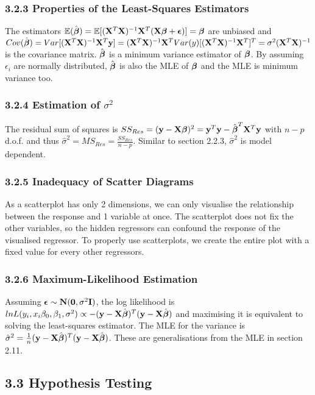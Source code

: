 \begin{multicols*}{3}
\subsubsection{3.2.3 Properties of the Least-Squares Estimators}
The estimators $\mathbb{E}(\hat{\boldsymbol{\beta}}) = \mathbb{E}[(\mathbf{X}^T\mathbf{X})^{-1}\mathbf{X}^T(\mathbf{X}\boldsymbol{\beta} + \boldsymbol{\epsilon})] = \boldsymbol{\beta}$ are unbiased and $Cov(\hat{\boldsymbol{\beta}}) = Var[(\mathbf{X}^T\mathbf{X})^{-1}\mathbf{X}^T\mathbf{y}] = (\mathbf{X}^T\mathbf{X})^{-1}\mathbf{X}^T Var(y) [(\mathbf{X}^T\mathbf{X})^{-1}\mathbf{X}^T]^T = \sigma^2(\mathbf{X}^T\mathbf{X})^{-1}$ is the covariance matrix. $\hat{\boldsymbol{\beta}}$ is a minimum variance estimator of $\boldsymbol{\beta}$. By assuming $\epsilon_i$ are normally distributed, $\hat{\boldsymbol{\beta}}$ is also the MLE of $\boldsymbol{\beta}$ and the MLE is minimum variance too.

\subsubsection{3.2.4 Estimation of $\sigma^2$}
The residual sum of squares is $SS_{Res} = (\mathbf{y} - \mathbf{X}\boldsymbol{\beta})^2 = \mathbf{y}^T\mathbf{y} - \hat{\boldsymbol{\beta}}^T\mathbf{X}^T\mathbf{y}$ with $n-p$ d.o.f. and thus $\hat{\sigma}^2 = MS_{Res} = \frac{SS_{Res}}{n-p}$. Similar to section 2.2.3, $\hat{\sigma}^2$ is model dependent.

\subsubsection{3.2.5 Inadequacy of Scatter Diagrams}
As a scatterplot has only 2 dimensions, we can only visualise the relationship between the response and 1 variable at once. The scatterplot does not fix the other variables, so the hidden regressors can confound the response of the visualised regressor. To properly use scatterplots, we create the entire plot with a fixed value for every other regressors. 

\subsubsection{3.2.6 Maximum-Likelihood Estimation}
Assuming $\boldsymbol{\epsilon} \sim \mathbf{N}(\mathbf{0}, \sigma^2\mathbf{I})$, the log likelihood is $ln L(y_i, x_i \beta_0, \beta_1, \sigma^2) \propto - (\mathbf{y} - \mathbf{X}\hat{\boldsymbol{\beta}})^T(\mathbf{y} - \mathbf{X}\hat{\boldsymbol{\beta}})$ and maximising it is equivalent to solving the least-squares estimator. The MLE for the variance is $\hat{\sigma}^2 = \frac{1}{n}(\mathbf{y} - \mathbf{X}\hat{\boldsymbol{\beta}})^T(\mathbf{y} - \mathbf{X}\hat{\boldsymbol{\beta}})$. These are generalisations from the MLE in section 2.11.

\subsection{3.3 Hypothesis Testing}

\end{multicols*}
